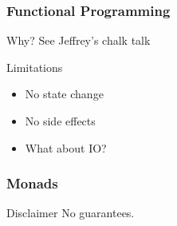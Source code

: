 \begin{frame}
    \frametitle{Functional Programming}
    \begin{block}{Why?}
        See Jeffrey's chalk talk
    \end{block}
    \begin{block}{Limitations}
        \begin{itemize}
            \item No state change
            \item No side effects
            \item What about IO?
        \end{itemize}
    \end{block}
\end{frame}
\begin{frame}
    \frametitle{Monads}
    \begin{block}{Disclaimer}
        No guarantees.
    \end{block}
\end{frame}
